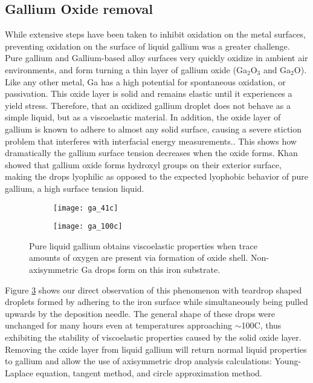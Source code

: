 \subsection{Gallium Oxide removal}


While extensive steps have been taken to inhibit oxidation on the metal surfaces, preventing oxidation on the surface of liquid gallium was a greater challenge. Pure gallium and Gallium-based alloy surfaces very quickly oxidize in ambient air environments, and form turning a thin layer of gallium oxide (Ga$_{2}$O$_{3}$ and Ga$_{2}$O).\cite{Regan1995,Regan1997,Scharmann2004} Like any other metal, Ga has a high potential for spontaneous oxidation, or passivation. This oxide layer is solid and remains elastic until it experiences a yield stress. Therefore, that an oxidized gallium droplet does not behave as a simple liquid, but as a viscoelastic material. In addition, the oxide layer of gallium is known to adhere to almost any solid surface, causing a severe stiction problem that interferes with interfacial energy measurements.\cite{Scharmann2004}. This shows how dramatically the gallium surface tension decreases when the oxide forms. Khan \etal showed that gallium oxide forms hydroxyl groups on their exterior surface, making the drops lyophilic as opposed to the expected lyophobic behavior of pure gallium, a high surface tension liquid.\cite{Hardy1985,Alchagirov2005} 

\begin{figure}
	\centering
	\begin{subfigure}[c]{0.45\textwidth}
		\texttt{[image: ga\_41c]}
		\subcaption{~}
		\label{fig:ga_41c}		
	\end{subfigure}
	\begin{subfigure}[c]{0.45\textwidth} 
		\texttt{[image: ga\_100c]}
		\subcaption{~}
		\label{fig:ga_100c}		
	\end{subfigure}
	\caption{Pure liquid gallium obtains viscoelastic properties when trace amounts of oxygen are present via formation of oxide shell. Non-axisymmetric Ga drops form on this iron substrate.}
	\label{fig:deformed_ga}
\end{figure}
Figure \ref{fig:deformed_ga} shows our direct observation of this phenomenon with teardrop shaped droplets formed by adhering to the iron surface while simultaneously being pulled upwards by the deposition needle. The general shape of these drops were unchanged for many hours even at temperatures approaching $\sim$100\degree C, thus exhibiting the stability of viscoelastic properties caused by the solid oxide layer. Removing the oxide layer from liquid gallium will return normal liquid properties to gallium and allow the use of axisymmetric drop analysis calculations: Young-Laplace equation, tangent method, and circle approximation method. 

